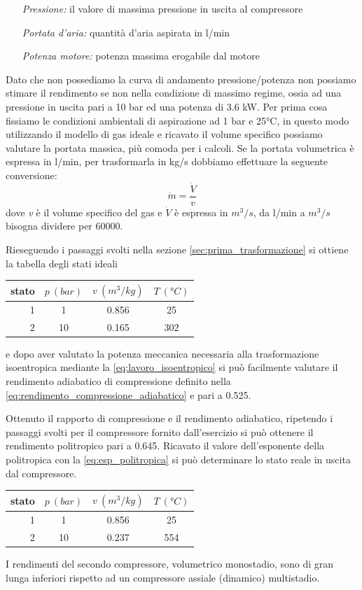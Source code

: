 \documentclass[a4paper,12pt]{article}
\begin{document}
\begin{itemize}
    \item [\textit{Pressione:}] il valore di massima pressione in uscita al compressore
    \item[\textit{Portata d'aria:}] quantità d'aria aspirata in l/min 
    \item[\textit{Potenza motore:}] potenza massima erogabile dal motore
\end{itemize} 

Dato che non possediamo la curva di andamento pressione/potenza non possiamo stimare il rendimento se non nella condizione
di massimo regime, ossia ad una pressione in uscita pari a 10 bar ed una potenza di 3.6 kW.
Per prima cosa fissiamo le condizioni ambientali di aspirazione ad 1 bar e 25°C, in questo modo utilizzando il modello
di gas ideale e ricavato il volume specifico possiamo valutare la portata massica, più comoda per i calcoli.
Se la portata volumetrica è espressa in l/min, per trasformarla in kg/s dobbiamo effettuare la seguente conversione:
\begin{equation*}
    \dot{m} = \frac{\dot{V}}{v}
\end{equation*}
dove \textit{v} è il volume specifico del gas e $\dot{V}$ è espressa in $m^3/s$, da l/min a $m^3/s$ bisogna dividere per 60000.

Rieseguendo i passaggi svolti nella sezione \ref{sec:prima_trasformazione} si ottiene la tabella degli stati ideali
\begin{center}
    \begin{tabular}{r|c|c|c}
        stato    & $p\ (bar)$ & $v\ (m^3/kg)$ & $T\ (\text{°}C) $\\ \hline
        1   &           1 &          0.856    &           25     \\ \hline
        2   &          10 &          0.165    &           302
    \end{tabular}
\end{center}
e dopo aver valutato la potenza meccanica necessaria alla trasformazione isoentropica mediante la \eqref{eq:lavoro_isoentropico}
si può facilmente valutare il rendimento adiabatico di compressione definito nella \eqref{eq:rendimento_compressione_adiabatico}
e pari a 0.525.

Ottenuto il rapporto di compressione e il rendimento adiabatico, ripetendo i passaggi svolti per il compressore fornito dall'esercizio
si può ottenere il rendimento politropico pari a 0.645.
Ricavato il valore dell'esponente della politropica con la \eqref{eq:esp_politropica} si può determinare lo stato reale in uscita dal compressore.
\begin{center}
    \begin{tabular}{r|c|c|c}
        stato    & $p\ (bar)$ & $v\ (m^3/kg)$ & $T\ (\text{°}C) $\\ \hline
        1   &           1 &          0.856    &           25     \\ \hline
        2   &          10 &          0.237    &           554
    \end{tabular}
\end{center}
I rendimenti del secondo compressore, volumetrico monostadio, sono di gran lunga inferiori rispetto ad un compressore assiale (dinamico) multistadio.
\end{document}
